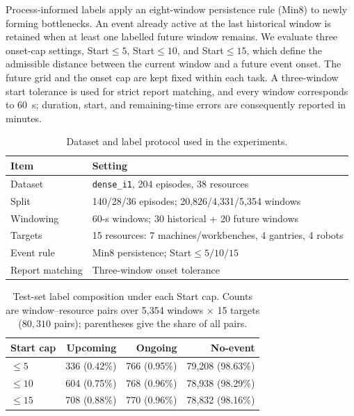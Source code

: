 \documentclass[a4paper,fleqn]{cas-dc}
\begin{document}
Process-informed labels apply an eight-window persistence rule (Min8) to newly forming bottlenecks. An event already active at the last historical window is retained when at least one labelled future window remains. We evaluate three onset-cap settings, Start$\leq5$, Start$\leq10$, and Start$\leq15$, which define the admissible distance between the current window and a future event onset. The future grid and the onset cap are kept fixed within each task. A three-window start tolerance is used for strict report matching, and every window corresponds to 60~s; duration, start, and remaining-time errors are consequently reported in minutes.

\begin{table}[t]
\centering
\caption{Dataset and label protocol used in the experiments.}
\label{tab:exp-dataset}
\scriptsize
\setlength{\tabcolsep}{4pt}
\renewcommand{\arraystretch}{1.08}
\begin{tabularx}{\columnwidth}{@{}lX@{}}
\toprule
Item & Setting \\
\midrule
Dataset & \texttt{dense\_i1}, 204 episodes, 38 resources \\
Split & 140/28/36 episodes; 20,826/4,331/5,354 windows \\
Windowing & 60-s windows; 30 historical + 20 future windows \\
Targets & 15 resources: 7 machines/workbenches, 4 gantries, 4 robots \\
Event rule & Min8 persistence; Start$\leq5/10/15$ \\
Report matching & Three-window onset tolerance \\
\bottomrule
\end{tabularx}
\end{table}

\begin{table}[t]
\centering
\caption{Test-set label composition under each Start cap. Counts are window--resource pairs over 5,354 windows $\times$ 15 targets ($80{,}310$ pairs); parentheses give the share of all pairs.}
\label{tab:dataset-labels}
\scriptsize
\setlength{\tabcolsep}{3.2pt}
\renewcommand{\arraystretch}{1.08}
\begin{tabular*}{\columnwidth}{@{\extracolsep{\fill}}lrrr@{}}
\toprule
Start cap & Upcoming & Ongoing & No-event \\
\midrule
$\leq5$ & 336 (0.42\%) & 766 (0.95\%) & 79,208 (98.63\%) \\
$\leq10$ & 604 (0.75\%) & 768 (0.96\%) & 78,938 (98.29\%) \\
$\leq15$ & 708 (0.88\%) & 770 (0.96\%) & 78,832 (98.16\%) \\
\bottomrule
\end{tabular*}
\end{table}
\end{document}
